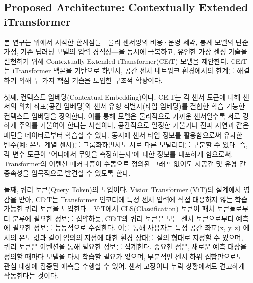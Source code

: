 \documentclass[final,5p,times,twocolumn,authoryear]{elsarticle}
\begin{document}
\subsection{Proposed Architecture: Contextually Extended iTransformer}
\label{subsec2}

본 연구는 위에서 지적한 한계점들—물리 센서망의 비용·운영 제약, 통계 모델의 단순 가정, 기존 딥러닝 모델의 입력 경직성—을 동시에 극복하고, 유연한 가상 센싱 기술을 실현하기 위해 Contextually Extended iTransformer(CEiT) 모델을 제안한다. CEiT는 iTransformer 백본을 기반으로 하면서, 공간 센서 네트워크 환경에서의 한계를 해결하기 위해 두 가지 핵심 기술을 도입한 구조적 확장이다.

첫째, 컨텍스트 임베딩(Contextual Embedding)이다. CEiT는 각 센서 토큰에 대해 센서의 위치 좌표(공간 임베딩)와 센서 유형 식별자(타입 임베딩)를 결합한 학습 가능한 컨텍스트 임베딩을 정의한다. 이를 통해 모델은 물리적으로 가까운 센서일수록 서로 강하게 주의를 기울여야 한다는 사실이나, 공간적으로 일정한 기울기나 전파 지연과 같은 패턴을 데이터로부터 학습할 수 있다. 동시에 센서 타입 정보를 활용함으로써 유사한 변수(예: 온도 계열 센서)를 그룹화하면서도 서로 다른 모달리티를 구분할 수 있다. 즉, 각 변수 토큰이 "어디에서 무엇을 측정하는지"에 대한 정보를 내포하게 함으로써, Transformer의 어텐션 메커니즘이 수동으로 정의된 그래프 없이도 시공간 및 유형 간 종속성을 암묵적으로 발견할 수 있도록 한다.


둘째, 쿼리 토큰(Query Token)의 도입이다. Vision Transformer (ViT)\cite{dosovitskiy2021iclr_vit}의 설계에서 영감을 받아, CEiT는 Transformer 인코더에 특정 센서 입력에 직접 대응하지 않는 학습 가능한 쿼리 토큰을 도입한다.  ViT에서 CLS(Classification) 토큰이 패치 토큰들로부터 분류에 필요한 정보를 집약하듯, CEiT의 쿼리 토큰은 모든 센서 토큰으로부터 예측에 필요한 정보를 능동적으로 수집한다. 이를 통해 사용자는 특정 공간 좌표(x, y, z) 에서의 온도 값과 같이 임의의 지점에 대한 환경 상태를 질의 형태로 지정할 수 있으며, 쿼리 토큰은 어텐션을 통해 필요한 정보를 집계한다. 중요한 점은, 새로운 예측 대상을 정의할 때마다 모델을 다시 학습할 필요가 없으며, 부분적인 센서 하위 집합만으로도 관심 대상에 집중된 예측을 수행할 수 있어, 센서 고장이나 누락 상황에서도 견고하게 작동한다는 것이다.
\end{document}
